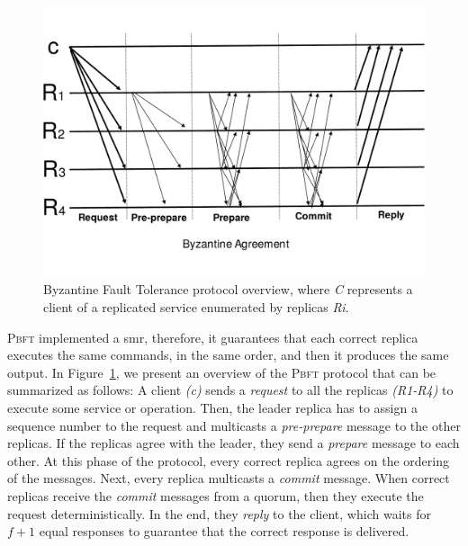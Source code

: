 \begin{figure}[h]
\begin{center}
\includegraphics[width=.7\columnwidth]{images/images/pbft.pdf}
\caption{Byzantine Fault Tolerance protocol overview, where \emph{C} represents a client of a replicated service enumerated by replicas \emph{Ri}.}
\label{fig:bft}
\end{center}
\end{figure}

\textsc{Pbft} implemented a \gls{smr}, therefore, it guarantees that each correct replica executes the same commands, in the same order, and then it produces the same output. 
In Figure~\ref{fig:bft}, we present an overview of the \textsc{Pbft} protocol that can be summarized as follows:
A client \emph{(c)} sends a \emph{request} to all the replicas \emph{(R1-R4)} to execute some service or operation.
Then, the leader replica has to assign a sequence number to the request and multicasts a \emph{pre-prepare} message to the other replicas. 
If the replicas agree with the leader, they send a \emph{prepare} message to each other. 
At this phase of the protocol, every correct replica agrees on the ordering of the messages.  
Next, every replica multicasts a \emph{commit} message. 
When correct replicas receive the \emph{commit} messages from a quorum, then they execute the request deterministically. 
In the end, they \emph{reply} to the client, which waits for $f+1$ equal responses to guarantee that the correct response is delivered.




